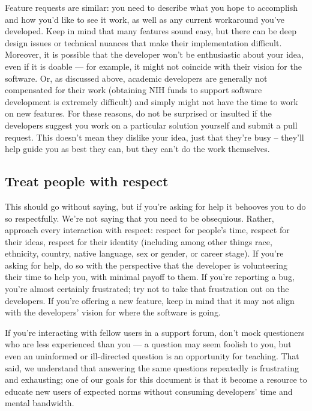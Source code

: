 \documentclass[9pt,training,pubversion]{livecoms}
\begin{document}
Feature requests are similar: you need to describe what you hope to accomplish
and how you'd like to see it work, as well as any current workaround you've
developed. Keep in mind that many features sound easy, but there can be deep
design issues or technical nuances that make their implementation difficult.
Moreover, it is possible that the developer won't be enthusiastic about your
idea, even if it is doable --- for example, it might not coincide with their
vision for the software. Or, as discussed above, academic developers are
generally not compensated for their work (obtaining NIH funds to support
software development is extremely difficult) and simply might not have the time
to work on new features. For these reasons, do not be surprised or insulted if
the developers suggest you work on a particular solution yourself and submit a
pull request. This doesn't mean they dislike your idea, just that they're busy -- they'll help guide you as best they can, but they can't do the work themselves.

\subsection{Treat people with respect}

This should go without saying, but if you're asking for help it behooves you to
do so respectfully. We're not saying that you need to be obsequious. Rather,
approach every interaction with respect: respect for people's time, respect for
their ideas, respect for their identity (including among other things race,
ethnicity, country, native language, sex or gender, or career stage). If you're
asking for help, do so with the perspective that the developer is volunteering
their time to help you, with minimal payoff to them.  If you're reporting a bug,
you're almost certainly frustrated; try not to take that frustration out on the
developers. If you're offering a new feature, keep in mind that it may not align
with the developers' vision for where the software is going.

If you're interacting with fellow users in a support forum, don't mock
questioners who are less experienced than you --- a question may seem foolish to
you, but even an uninformed or ill-directed question is an opportunity for
teaching. That said, we understand that answering the same questions repeatedly
is frustrating and exhausting; one of our goals for this document is that it
become a resource to educate new users of expected norms without consuming
developers' time and mental bandwidth.
\end{document}
